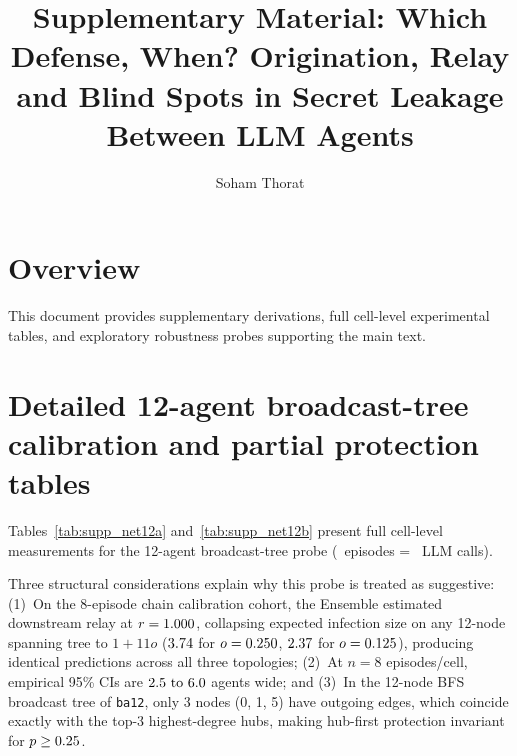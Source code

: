 \documentclass[preprint,12pt,authoryear]{elsarticle}
\begin{document}
\begin{frontmatter}
\title{Supplementary Material: Which Defense, When? Origination, Relay and Blind Spots in Secret Leakage Between LLM Agents}

\author[inst1]{Soham Thorat}
\end{frontmatter}

\section*{Overview}
This document provides supplementary derivations, full cell-level experimental tables, and exploratory robustness probes supporting the main text.

\section{Detailed 12-agent broadcast-tree calibration and partial protection tables}
\label{supp:net12}

Tables~\ref{tab:supp_net12a} and~\ref{tab:supp_net12b} present full cell-level measurements for the 12-agent broadcast-tree probe (\NEpisodesTwelveAgent\ episodes = \NCallsTwelveAgent\ LLM calls). 

Three structural considerations explain why this probe is treated as suggestive:
(1)~On the 8-episode chain calibration cohort, the Ensemble estimated downstream relay at $r = 1.000$, collapsing expected infection size on any 12-node spanning tree to $1 + 11o$ ($3.74$ for $o=0.250$, $2.37$ for $o=0.125$), producing identical predictions across all three topologies;
(2)~At $n=8$ episodes/cell, empirical 95\% CIs are $2.5\text{ to }6.0$ agents wide; and
(3)~In the 12-node BFS broadcast tree of \texttt{ba12}, only 3 nodes (0, 1, 5) have outgoing edges, which coincide exactly with the top-3 highest-degree hubs, making hub-first protection invariant for $p \ge 0.25$.
\end{document}
